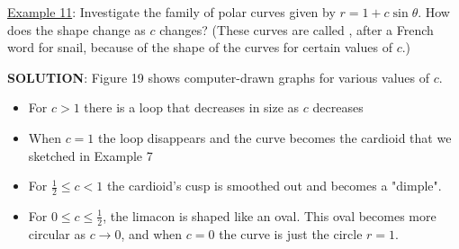 \documentclass[paper=a4, fontsize=11pt]{scrartcl} %
\numberwithin{equation}{section} %
\numberwithin{figure}{section} %
\numberwithin{table}{section} %
\newcommand{\ds}{\displaystyle}
\begin{document}
\underline{Example 11}: Investigate the family of polar curves given by $r=1+c\sin\theta$. How does the shape change as $c$ changes? (These curves are called \underline{\hspace{1.25in}}, after a French word for snail, because of the shape of the curves for certain values of $c$.)\\
\indent

\textbf{SOLUTION}: Figure 19 shows computer-drawn graphs for various values of $c$.\\
\begin{itemize}
\item For $c>1$ there is a loop that decreases in size as $c$ decreases
\item When $c=1$ the loop disappears and the curve becomes the cardioid that we sketched in Example 7
\item For $\ds\frac{1}{2} \leq c < 1$ the cardioid's cusp is smoothed out and becomes a "dimple".
\item For $0\leq c \leq \ds\frac{1}{2}$, the limacon is shaped like an oval. This oval becomes more circular as $c\to 0$, and when $c=0$ the curve is just the circle $r=1$.
\end{itemize}

\end{document}
